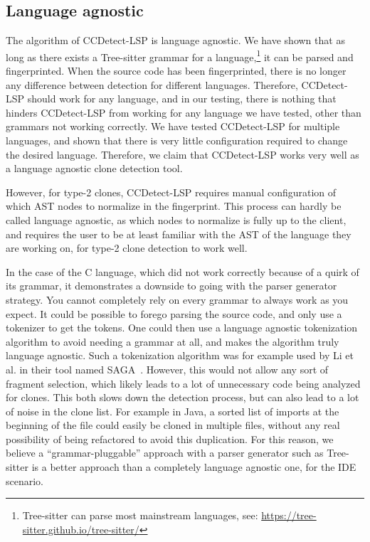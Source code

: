 \subsection*{Language agnostic}

The algorithm of CCDetect-LSP is language agnostic. We have shown that as long as there
exists a Tree-sitter grammar for a language,\footnote{Tree-sitter can parse most
mainstream languages, see: \url{https://tree-sitter.github.io/tree-sitter/}} it can be
parsed and fingerprinted. When the source code has been fingerprinted, there is no longer
any difference between detection for different languages. Therefore, CCDetect-LSP should
work for any language, and in our testing, there is nothing that hinders CCDetect-LSP from
working for any language we have tested, other than grammars not working correctly. We
have tested CCDetect-LSP for multiple languages, and shown that there is very little
configuration required to change the desired language. Therefore, we claim that
CCDetect-LSP works very well as a language agnostic clone detection tool.

However, for type-2 clones, CCDetect-LSP requires manual configuration of which AST nodes
to normalize in the fingerprint. This process can hardly be called language agnostic, as
which nodes to normalize is fully up to the client, and requires the user to be at least
familiar with the AST of the language they are working on, for type-2 clone detection to
work well.

In the case of the C language, which did not work correctly because of a quirk of its
grammar, it demonstrates a downside to going with the parser generator strategy. You
cannot completely rely on every grammar to always work as you expect. It could be possible
to forego parsing the source code, and only use a tokenizer to get the tokens. One could
then use a language agnostic tokenization algorithm to avoid needing a grammar at all, and
makes the algorithm truly language agnostic. Such a tokenization algorithm was for example
used by Li et al. in their tool named SAGA~\cite{SAGA}. However, this would not allow any
sort of fragment selection, which likely leads to a lot of unnecessary code being analyzed
for clones. This both slows down the detection process, but can also lead to a lot of
noise in the clone list. For example in Java, a sorted list of imports at the beginning of
the file could easily be cloned in multiple files, without any real possibility of being
refactored to avoid this duplication. For this reason, we believe a ``grammar-pluggable''
approach with a parser generator such as Tree-sitter is a better approach than a
completely language agnostic one, for the IDE scenario.

